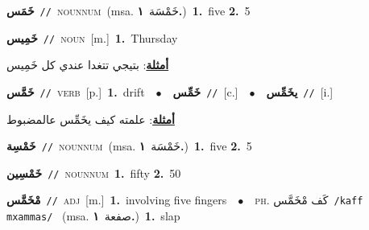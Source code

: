 \documentclass[10pt,a4paper,twoside]{article} %
\begin{document}
\begin{multicols}{2}
{\setlength\topsep{0pt}\textbf{\foreignlanguage{arabic}{خَمَس}}\ {\color{gray}\texttt{//}\color{black}}\ \textsc{noun\textunderscore num}\ \color{gray}(msa. \foreignlanguage{arabic}{خَمْسَة}~\foreignlanguage{arabic}{\textbf{١.}})\color{black}\ \textbf{1.}~five  \textbf{2.}~5\ } \vspace{2mm}

{\setlength\topsep{0pt}\textbf{\foreignlanguage{arabic}{خَمِيس}}\ {\color{gray}\texttt{//}\color{black}}\ \textsc{noun}\ [m.]\ \textbf{1.}~Thursday\  \begin{flushright}\color{gray}\foreignlanguage{arabic}{\textbf{\underline{\foreignlanguage{arabic}{أمثلة}}}: بتيجي تتغدا عندي كل خَمِيس}\end{flushright}\color{black}} \vspace{2mm}

{\setlength\topsep{0pt}\textbf{\foreignlanguage{arabic}{خَمَّس}}\ {\color{gray}\texttt{//}\color{black}}\ \textsc{verb}\ [p.]\ \textbf{1.}~drift\ \ $\bullet$\ \ \setlength\topsep{0pt}\textbf{\foreignlanguage{arabic}{خَمِّس}}\ {\color{gray}\texttt{//}\color{black}}\ [c.]\ \ $\bullet$\ \ \setlength\topsep{0pt}\textbf{\foreignlanguage{arabic}{يخَمِّس}}\ {\color{gray}\texttt{//}\color{black}}\ [i.]\  \begin{flushright}\color{gray}\foreignlanguage{arabic}{\textbf{\underline{\foreignlanguage{arabic}{أمثلة}}}: علمته كيف يخَمِّس عالمضبوط}\end{flushright}\color{black}} \vspace{2mm}

{\setlength\topsep{0pt}\textbf{\foreignlanguage{arabic}{خَمْسِة}}\ {\color{gray}\texttt{//}\color{black}}\ \textsc{noun\textunderscore num}\ \color{gray}(msa. \foreignlanguage{arabic}{خَمْسَة}~\foreignlanguage{arabic}{\textbf{١.}})\color{black}\ \textbf{1.}~five  \textbf{2.}~5\ } \vspace{2mm}

{\setlength\topsep{0pt}\textbf{\foreignlanguage{arabic}{خَمْسِين}}\ {\color{gray}\texttt{//}\color{black}}\ \textsc{noun\textunderscore num}\ \textbf{1.}~fifty  \textbf{2.}~50\ } \vspace{2mm}

{\setlength\topsep{0pt}\textbf{\foreignlanguage{arabic}{مْخَمَّس}}\ {\color{gray}\texttt{//}\color{black}}\ \textsc{adj}\ [m.]\ \textbf{1.}~involving five fingers\ \ $\bullet$\ \ \textsc{ph.} \color{gray} \foreignlanguage{arabic}{كَف مْخَمَّس}\color{black}\ {\color{gray}\texttt{/{\sffamily kaff mxammas}/}\color{black}}\ \color{gray} (msa. \foreignlanguage{arabic}{صفعة}~\foreignlanguage{arabic}{\textbf{١.}})\color{black}\ \textbf{1.}~slap\ } \vspace{2mm}


\end{multicols}
\end{document}
